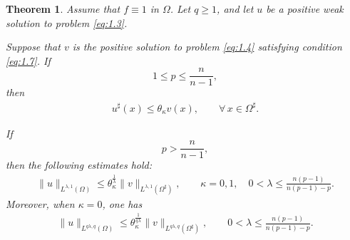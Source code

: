 \documentclass[10pt,a4paper]{amsart}
\newtheorem{theorem}{Theorem}
\begin{document}
\begin{theorem}\label{thm:1.3}
Assume that $f\equiv1$ in $\Omega$.
Let $q\ge 1$, and let $u$ be a positive weak solution to problem \eqref{eq:1.3}.

Suppose that $v$ is the positive solution to problem \eqref{eq:1.4}
satisfying condition \eqref{eq:1.7}. If
\[
1\le p\le \frac{n}{n-1},
\]
then
\begin{align}
u^\sharp(x)\le \theta_\kappa v(x),
\qquad
\forall\,x\in\Omega^\sharp.
\end{align}

If
\[
p > \frac{n}{n-1},
\]
then the following estimates hold:
\begin{align}\label{eq:1.13}
\|u\|_{L^{\lambda,1}(\Omega)}
\le
\theta_\kappa^{\frac{1}{\lambda}}
\|v\|_{L^{\lambda,1}(\Omega^\sharp)},
\qquad
\kappa=0,1,
\quad
0<\lambda \le\frac{n(p-1)}{n(p-1)-p}.
\end{align}
Moreover, when $\kappa=0$, one has
\begin{align}\label{eq:1.14}
\|u\|_{L^{q\lambda,q}(\Omega)}
\le
\theta_\kappa^{\frac{1}{q\lambda}}
\|v\|_{L^{q\lambda,q}(\Omega^\sharp)},
\qquad
0<\lambda \le\frac{n(p-1)}{n(p-1)-p}.
\end{align}
\end{theorem}
\end{document}
